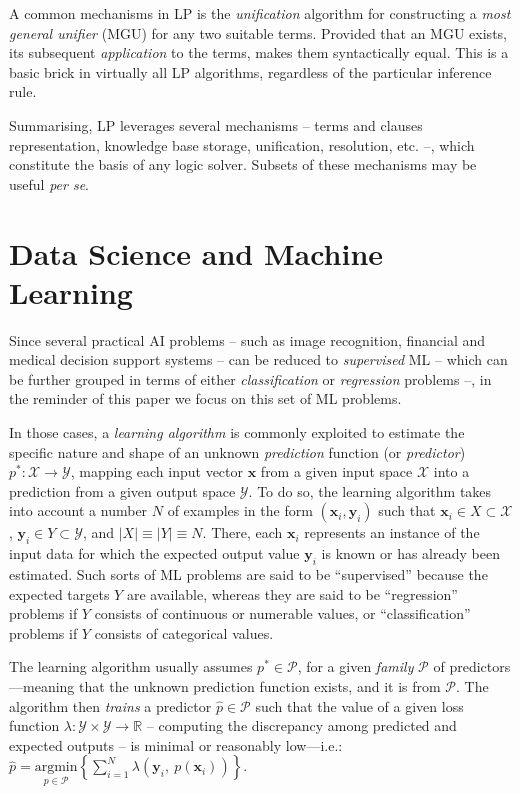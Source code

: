 \documentclass[12pt,a4paper,openright,twoside]{book}
\begin{document}
A common mechanisms in LP is the \emph{unification} algorithm \cite{MartelliMontanari1982} for constructing a \emph{most general unifier} (MGU) for any two suitable terms.
%
Provided that an MGU exists, its subsequent \emph{application} to the terms, makes them syntactically equal.
%
This is a basic brick in virtually all LP algorithms, regardless of the particular inference rule.

Summarising, LP leverages several mechanisms -- terms and clauses representation, knowledge base storage, unification, resolution, etc. --, which constitute the basis of any logic solver.
%
Subsets of these mechanisms may be useful \textit{per se}.

\section{Data Science and Machine Learning}
%

Since several practical AI problems -- such as image recognition, financial and medical decision support systems -- can be reduced to \emph{supervised} ML -- which can be further grouped in terms of either  \emph{classification} or \emph{regression} problems \cite{twala2010,smlreview-faia160} --, in the reminder of this paper we focus on this set of ML problems. 

In those cases, a \emph{learning algorithm} is commonly exploited to estimate the specific nature and shape of an unknown \emph{prediction} function (or \emph{predictor}) $p^*: \mathcal{X} \rightarrow \mathcal{Y}$, mapping each input vector $\mathbf{x}$ from a given input space $\mathcal{X}$ into a prediction from a given output space $\mathcal{Y}$.
%
To do so, the learning algorithm takes into account a number $N$ of examples in the form $(\mathbf{x}_i,\mathbf{y}_i)$ such that $\mathbf{x}_i \in X \subset \mathcal{X}$, $\mathbf{y}_i \in Y \subset \mathcal{Y}$, and $|X| \equiv |Y| \equiv N$.
%
There, each $\mathbf{x}_i$ represents an instance of the input data for which the expected output value $\mathbf{y}_i$ is known or has already been estimated.
%
Such sorts of ML problems are said to be ``supervised'' because the expected targets $Y$ are available, whereas they are said to be ``regression'' problems if $Y$ consists of continuous or numerable values, or ``classification'' problems if $Y$ consists of categorical values. 

The learning algorithm usually assumes $p^* \in \mathcal{P}$, for a given \emph{family} $\mathcal{P}$ of predictors---meaning that the unknown prediction function exists, and it is from $\mathcal{P}$.
%
The algorithm then \emph{trains} a predictor $\hat{p} \in \mathcal{P}$ such that the value of a given loss function $\lambda : \mathcal{Y} \times \mathcal{Y} \rightarrow \mathbb{R}$ -- computing the discrepancy among predicted and expected outputs -- is minimal or reasonably low---i.e.: $\hat{p} = \underset{p \in \mathcal{P}}{\text{argmin}} \left\{ \sum_{i=1}^{N} \lambda(\mathbf{y}_i,\ p(\mathbf{x}_i)) \right\}$.
\end{document}
